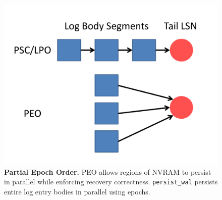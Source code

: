 \begin{figure}
\centering
\includegraphics[width=.7\textwidth]{PMC/persist_wal.pdf}
\caption{\textbf{Partial Epoch Order.} PEO allows regions of NVRAM to persist in parallel while enforcing recovery correctness. \texttt{persist\_wal} persists entire log entry bodies in parallel using epochs.}
\label{fig:persist_wal_persist}
\end{figure}
